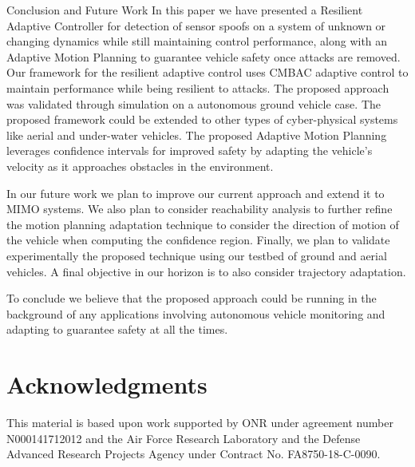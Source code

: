 
\begin{section}{Conclusion and Future Work} \label{sec:conclusion}
In this paper we have presented a Resilient Adaptive Controller for detection of sensor spoofs on a system of unknown or changing dynamics while still maintaining control performance, along with an Adaptive Motion Planning to guarantee vehicle safety once attacks are removed. Our framework for the resilient adaptive control uses CMBAC adaptive control to maintain performance while being resilient to attacks. The proposed approach was validated through simulation on a autonomous ground vehicle case. The proposed framework could be extended to other types of cyber-physical systems like aerial and under-water vehicles. The proposed Adaptive Motion Planning leverages confidence intervals for improved safety by adapting the vehicle's velocity as it approaches obstacles in the environment.

In our future work we plan to improve our current approach and extend it to MIMO systems. We also plan to consider reachability analysis to further refine the motion planning adaptation technique to consider the direction of motion of the vehicle when computing the confidence region. Finally, we plan to validate experimentally the proposed technique using our testbed of ground and aerial vehicles. A final objective in our horizon is to also consider trajectory adaptation.

To conclude we believe that the proposed approach could be running in the background of any applications involving autonomous vehicle monitoring and adapting to guarantee safety at all the times.


\end{section}
 \vspace{-10pt}
\section*{Acknowledgments} 
This material is based upon work supported by ONR under agreement number N000141712012 and 
the Air Force Research Laboratory and the Defense Advanced Research Projects Agency under Contract No. FA8750-18-C-0090. 
 \vspace{-5pt}


